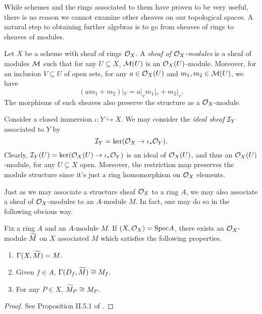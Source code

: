 While schemes and the rings associated to them have proven to be very useful,
there is no reason we cannot examine other sheaves on our topological spaces.
A natural step to obtaining further algebras is to go from sheaves of rings to sheaves of modules.

\begin{definition}
    Let $X$ be a scheme with sheaf of rings $\mathcal{O}_X$.
    A \textit{sheaf of $\mathcal{O}_X$-modules} is a sheaf of modules $\mathcal{M}$ such that for any $U \subseteq X$,
    $\mathcal{M}(U)$ is an $\mathcal{O}_X(U)$-module.
    Moreover, for an inclusion $V \subseteq U$ of open sets,
    for any $a \in \mathcal{O}_X(U)$ and $m_1, m_2 \in \mathcal{M}(U)$,
    we have
    \[
        (am_1 + m_2)|_V
        = a|_v m_1|_v + m_2|_v.
    \]
    The morphisms of such sheaves also preserve the structure as a $\mathcal{O}_X$-module.
\end{definition}

\begin{example}
    Consider a closed immersion $\iota : Y \hookrightarrow X$.
    We may consider the \textit{ideal sheaf} $\mathcal{I}_Y$ associated to $Y$ by
    \[
        \mathcal{I}_Y = \ker(\mathcal{O}_X \to \iota_* \mathcal{O}_Y).
    \]
    Clearly, $\mathcal{I}_Y(U) = \ker(\mathcal{O}_X(U) \to \iota_* \mathcal{O}_Y)$ is an ideal of $\mathcal{O}_X(U)$, 
    and thus an $\mathcal{O}_X(U)$-module, for any $U \subseteq X$ open.
    Moreover, the restriction map preserves the module structure since it's just a ring homomorphism on $\mathcal{O}_X$ elements. 
\end{example}

Just as we may associate a structure sheaf $\mathcal{O}_X$ to a ring $A$,
we may also associate a sheaf of $\mathcal{O}_X$-modules to an $A$-module $M$.
In fact, one may do so in the following obvious way.

\begin{proposition}
    Fix a ring $A$ and an $A$-module $M$.
    If $(X, \mathcal{O}_X) = {\rm Spec} A$,
    there exists an $\mathcal{O}_X$-module $\widetilde M$ on $X$ associated $M$ which satisfies the following properties.
    \begin{enumerate}
        \item $\Gamma(X, \widetilde M) = M$.
        \item Given $f \in A$, $\Gamma(D_f, \widetilde M) \cong M_f$.
        \item For any $P \in X$, $\widetilde M_P \cong M_P$.
    \end{enumerate}
\end{proposition}
\begin{proof}
    See Proposition II.5.1 of \cite{Hartshorne_2013}.
\end{proof}

